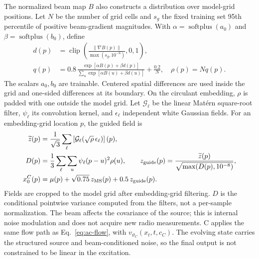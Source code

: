 The normalized beam map $B$ also constructs a distribution over model-grid
positions. Let $N$ be the number of grid cells and $s_g$ the fixed training
set 95th percentile of positive beam-gradient magnitudes. With
$\alpha=\operatorname{softplus}(a_0)$ and
$\beta=\operatorname{softplus}(b_0)$, define
\begin{align}
 d(p)&=\operatorname{clip}\!\left(\frac{\lVert\nabla B(p)\rVert}{\max(s_g,10^{-6})},0,1\right),\\
 q(p)&=0.8\,\frac{\exp[\alpha B(p)+\beta d(p)]}
 {\sum_{u}\exp[\alpha B(u)+\beta d(u)]}+\frac{0.2}{N},\quad
 \rho(p)=Nq(p).
 \label{eq:ac-probability}
\end{align}
The scalars $a_0,b_0$ are trainable. Centered spatial differences are used
inside the grid and one-sided differences at its boundary. On the circulant
embedding, $\rho$ is padded with one outside the model grid. Let
$\mathcal G_\ell$ be the linear Mat\'{e}rn square-root filter, $\psi_\ell$
its convolution kernel, and $\epsilon_\ell$ independent white Gaussian
fields. For an embedding-grid location $p$, the guided field is
\begin{align}
 \widetilde z(p)&=\frac{1}{\sqrt 3}\sum_\ell
 \left[\mathcal G_\ell(\sqrt{\rho}\,\epsilon_\ell)\right](p),\\
 D(p)&=\frac{1}{3}\sum_\ell\sum_u \psi_\ell(p-u)^2\rho(u),\qquad
 z_{\rm guide}(p)=\frac{\widetilde z(p)}{\sqrt{\max(D(p),10^{-8})}},\\
 x_0^C(p)&=\mu(p)+\sqrt{0.75}\,z_{\rm MS}(p)+0.5\,z_{\rm guide}(p).
 \label{eq:ac-c-source}
\end{align}
Fields are cropped to the model grid after embedding-grid filtering. $D$ is
the conditional pointwise variance computed from the filters, not a
per-sample normalization. The beam affects the covariance of the source;
this is internal noise modulation and does not acquire new radio measurements.
C applies the same flow path as Eq.~\eqref{eq:ac-flow}, with
$v_{\vartheta_C}(x_t,t,c_C)$. The evolving state carries the structured source
and beam-conditioned noise, so the final output is not constrained to be
linear in the excitation.

